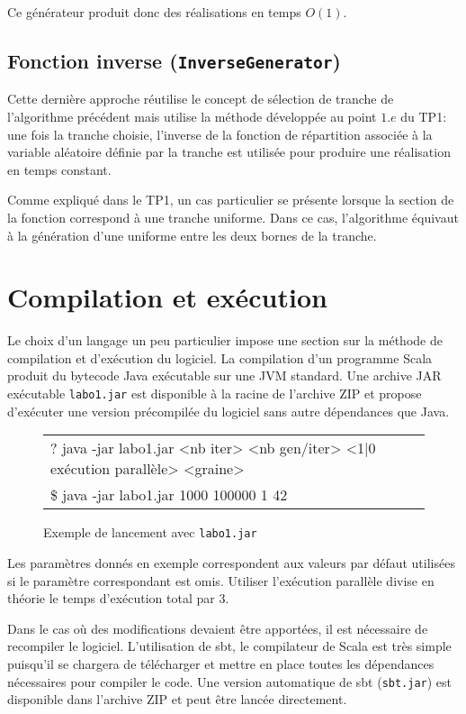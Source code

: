 \documentclass[a4paper,11pt]{article}
\begin{document}
Ce générateur produit donc des réalisations en temps $O(1)$.

\subsection{Fonction inverse {\normalfont({\tt InverseGenerator})}}

Cette dernière approche réutilise le concept de sélection de tranche de l'algorithme précédent mais utilise la méthode développée au point $1.e$ du TP1: une fois la tranche choisie, l'inverse de la fonction de répartition associée à la variable aléatoire définie par la tranche est utilisée pour produire une réalisation en temps constant.

Comme expliqué dans le TP1, un cas particulier se présente lorsque la section de la fonction correspond à une tranche uniforme. Dans ce cas, l'algorithme équivaut à la génération d'une uniforme entre les deux bornes de la tranche. 

\section{Compilation et exécution}

Le choix d'un langage un peu particulier impose une section sur la méthode de compilation et d'exécution du logiciel. La compilation d'un programme Scala produit du bytecode Java exécutable sur une JVM standard. Une archive JAR exécutable \texttt{labo1.jar} est disponible à la racine de l'archive ZIP et propose d'exécuter une version précompilée du logiciel sans autre dépendances que Java.

\begin{figure}[h]
\begin{tabular}{l}
	\hline
	{\ttfamily\color{gray}
	? java -jar labo1.jar <nb iter> <nb gen/iter> <1|0 exécution parallèle> <graine>}\\
	{\ttfamily
	\$ java -jar labo1.jar 1000 100000 1 42}\\
	\hline
\end{tabular}
\caption{Exemple de lancement avec \texttt{labo1.jar}}
\end{figure}

Les paramètres donnés en exemple correspondent aux valeurs par défaut utilisées si le paramètre correspondant est omis. Utiliser l'exécution parallèle divise en théorie le temps d'exécution total par 3.

Dans le cas où des modifications devaient être apportées, il est nécessaire de recompiler le logiciel. L'utilisation de sbt, le compilateur de Scala est très simple puisqu'il se chargera de télécharger et mettre en place toutes les dépendances nécessaires pour compiler le code. Une version automatique de sbt (\texttt{sbt.jar}) est disponible dans l'archive ZIP et peut être lancée directement.
\end{document}
